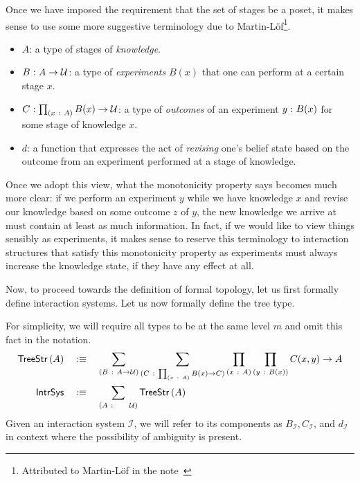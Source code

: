 Once we have imposed the requirement that the set of stages be a poset, it makes sense to
use some more suggestive terminology due to Martin-Löf\footnote{Attributed to
  Martin-Löf in the note~\cite{coq-posets}}.
\begin{itemize}
  \item $A$: a type of stages of \emph{knowledge}.
  \item $B\hspace{0.1mm}:\hspace{0.1mm}A \rightarrow \mathcal{U}{}$: a type of \emph{experiments} $B(x)$ that one can perform at a
    certain stage $x$.
  \item $C\hspace{0.1mm}:\hspace{0.1mm}\prod_{(x~:~A)} B(x) \rightarrow \mathcal{U}{}$: a type of \emph{outcomes} of an
    experiment $y\hspace{0.1mm}:\hspace{0.1mm}B(x)$ for some stage of knowledge $x$.
  \item $d$: a function that expresses the act of \emph{revising} one's belief state based
    on the outcome from an experiment performed at a stage of knowledge.
\end{itemize}
Once we adopt this view, what the monotonicity property says becomes much more clear: if
we perform an experiment $y$ while we have knowledge $x$ and revise our knowledge based on
some outcome $z$ of $y$, the new knowledge we arrive at must contain at least as much
information. In fact, if we would like to view things sensibly as experiments, it makes
sense to reserve this terminology to interaction structures that satisfy this monotonicity
property as experiments must always increase the knowledge state, if they have any effect
at all.

Now, to proceed towards the definition of formal topology, let us first formally define
interaction systems.
Let us now formally define the tree type.
\begin{defn}\label{defn:intr-sys}
  For simplicity, we will require all types to be at the same level $m$ and omit this fact
  in the notation.
  \begin{align*}
    \treestr{A} &\quad\is\quad
      \sigmaty{B}{A \rightarrow \univ}{
        \sigmaty{C}{\pity{x}{A}{B(x) \rightarrow C}}{
          \pity{x}{A}{\pity{y}{B(x)}{C(x, y) \rightarrow A}}
        }
      }\\
    \mathsf{IntrSys} &\quad\is\quad \sigmaty{A}{~~~~\univ}{\treestr{A}}
  \end{align*}
  Given an interaction system $\mathcal{I}$, we will refer to its components as
  $B_{\mathcal{I}}, C_{\mathcal{I}}$, and $d_{\mathcal{I}}$ in context where the possibility of
  ambiguity is present.
\end{defn}

